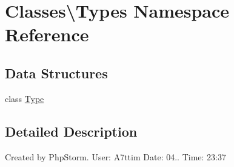 \hypertarget{namespace_classes_1_1_types}{}\section{Classes\textbackslash{}Types Namespace Reference}
\label{namespace_classes_1_1_types}
\subsection*{Data Structures}
\begin{DoxyCompactItemize}
\item 
class \hyperlink{class_classes_1_1_types_1_1_type}{Type}
\end{DoxyCompactItemize}


\subsection{Detailed Description}
Created by Php\+Storm. User\+: A7ttim Date\+: 04.. Time\+: 23\+:37 